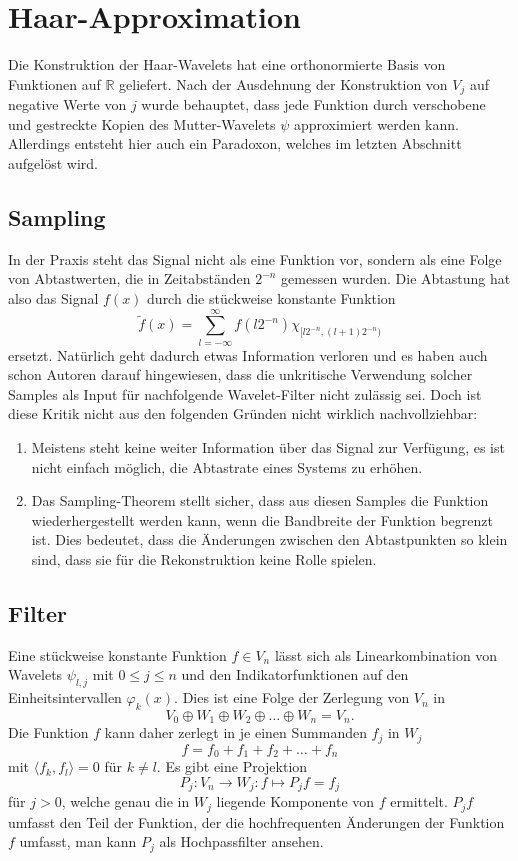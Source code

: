 %
%
%
\section{Haar-Approximation
\label{haar:approximation}}
Die Konstruktion der Haar-Wavelets hat eine orthonormierte Basis von
Funktionen auf $\mathbb R$ geliefert.
Nach der Ausdehnung der Konstruktion von $V_j$ auf negative Werte von $j$
wurde behauptet, dass jede Funktion durch verschobene und gestreckte 
Kopien des Mutter-Wavelets $\psi$ approximiert werden kann.
Allerdings entsteht hier auch ein Paradoxon, welches im letzten Abschnitt
aufgelöst wird.

\subsection{Sampling}
In der Praxis steht das Signal nicht als eine Funktion vor, sondern
als eine Folge von Abtastwerten, die in Zeitabständen $2^{-n}$ 
gemessen wurden.
Die Abtastung hat also das Signal $f(x)$ durch die stückweise
konstante Funktion
\[
\tilde{f}(x)
=
\sum_{l=-\infty}^\infty f(l2^{-n}) \chi_{[l2^{-n},(l+1)2^{-n})}
\]
ersetzt.
Natürlich geht dadurch etwas Information verloren und es haben auch
schon Autoren darauf hingewiesen, dass die unkritische Verwendung solcher
Samples als Input für nachfolgende Wavelet-Filter nicht zulässig sei.
Doch ist diese Kritik nicht aus den folgenden Gründen nicht wirklich
nachvollziehbar:
\begin{enumerate}
\item
Meistens steht keine weiter Information über das Signal zur Verfügung,
es ist nicht einfach möglich, die Abtastrate eines Systems zu erhöhen.
\item
Das Sampling-Theorem stellt sicher, dass aus diesen Samples die Funktion
wiederhergestellt werden kann, wenn die Bandbreite der Funktion 
begrenzt ist.
Dies bedeutet, dass die Änderungen zwischen den Abtastpunkten so klein
sind, dass sie für die Rekonstruktion keine Rolle spielen.
\end{enumerate}

\subsection{Filter}
Eine stückweise konstante Funktion $f\in V_n$ lässt sich als Linearkombination
von Wavelets $\psi_{l,j}$ mit $0\le j \le n$ und den Indikatorfunktionen
auf den Einheitsintervallen $\varphi_k(x)$. 
Dies ist eine Folge der Zerlegung von $V_n$ in
\begin{equation}
V_0 \oplus W_1 \oplus W_2 \oplus \dots \oplus W_n = V_n.
\label{haar:filtersumme}
\end{equation}
Die Funktion $f$ kann daher zerlegt in je einen Summanden $f_j$ in $W_j$
\[
f = f_0 + f_1 + f_2 + \dots + f_n
\]
mit $\langle f_k,f_l\rangle = 0$ für $k\ne l$.
Es gibt eine Projektion
\[
P_j \colon V_n \to W_j : f \mapsto P_jf = f_j
\]
für $j>0$, welche genau die in $W_j$ liegende Komponente von $f$ 
ermittelt.
$P_jf$ umfasst den Teil der Funktion, der die hochfrequenten Änderungen
der Funktion $f$ umfasst, man kann $P_j$ als Hochpassfilter ansehen.

